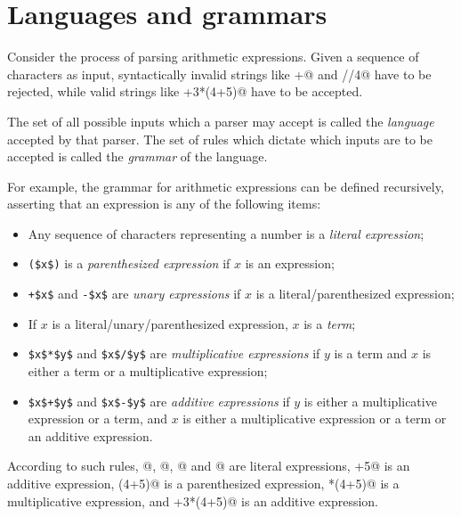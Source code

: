 \documentclass[UdineBachThesis,american,11pt]{PhdThesis}
\begin{document}
  \section{Languages and grammars}

  Consider the process of parsing arithmetic expressions. Given a sequence of
  characters as input, syntactically invalid strings like +@ and
  //4@ have to be rejected, while valid strings like
  +3*(4+5)@ have to be accepted.

  The set of all possible inputs which a parser may accept is called the
  \emph{language} accepted by that parser. The set of rules which dictate which
  inputs are to be accepted is called the \emph{grammar} of the language.

  For example, the grammar for arithmetic expressions can be defined
  recursively, asserting that an expression is any of the following items:

  \begin{itemize}
    \item Any sequence of characters representing a number is a \emph{literal
    expression};

    \item \lstinline[mathescape]@($x$)@ is a \emph{parenthesized expression} if
    $x$ is an expression;

    \item \lstinline[mathescape]@+$x$@ and \lstinline[mathescape]@-$x$@ are
    \emph{unary expressions} if $x$ is a literal/parenthesized expression;

    \item If $x$ is a literal/unary/parenthesized expression, $x$ is a
    \emph{term};

    \item \lstinline[mathescape]@$x$*$y$@ and \lstinline[mathescape]@$x$/$y$@
    are \emph{multiplicative expressions} if $y$ is a term and $x$ is either a
    term or a multiplicative expression;

    \item \lstinline[mathescape]@$x$+$y$@ and \lstinline[mathescape]@$x$-$y$@
    are \emph{additive expressions} if $y$ is either a multiplicative expression
    or a term, and $x$ is either a multiplicative expression or a term or an
    additive expression.
  \end{itemize}

  According to such rules, @, @, @ and
  @ are literal expressions, +5@ is an additive
  expression, \lstinline@(4+5)@ is a parenthesized expression,
  *(4+5)@ is a multiplicative expression, and +3*(4+5)@
  is an additive expression.
\end{document}
